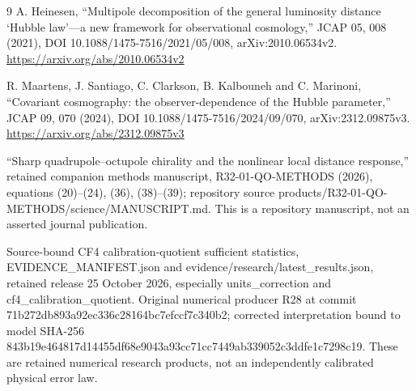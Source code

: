 \begin{thebibliography}{9}
 A. Heinesen, ``Multipole decomposition of the general luminosity distance `Hubble law'---a new framework for observational cosmology,'' JCAP 05, 008 (2021), DOI 10.1088/1475-7516/2021/05/008, arXiv:2010.06534v2. \url{https://arxiv.org/abs/2010.06534v2}

 R. Maartens, J. Santiago, C. Clarkson, B. Kalbouneh and C. Marinoni, ``Covariant cosmography: the observer-dependence of the Hubble parameter,'' JCAP 09, 070 (2024), DOI 10.1088/1475-7516/2024/09/070, arXiv:2312.09875v3. \url{https://arxiv.org/abs/2312.09875v3}

 ``Sharp quadrupole--octupole chirality and the nonlinear local distance response,'' retained companion methods manuscript, R32-01-QO-METHODS (2026), equations (20)--(24), (36), (38)--(39); repository source products/R32-01-QO-METHODS/science/MANUSCRIPT.md. This is a repository manuscript, not an asserted journal publication.

 Source-bound CF4 calibration-quotient sufficient statistics, EVIDENCE\_MANIFEST.json and evidence/research/latest\_results.json, retained release 25 October 2026, especially units\_correction and cf4\_calibration\_quotient. Original numerical producer R28 at commit 71b272db893a92ec336c28164bc7efccf7c340b2; corrected interpretation bound to model SHA-256 843b19e464817d14455df68e9043a93cc71cc7449ab339052c3ddfe1c7298c19. These are retained numerical research products, not an independently calibrated physical error law.
\end{thebibliography}
